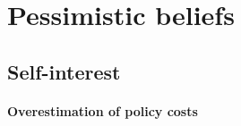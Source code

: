 \documentclass[12pt]{article} %
\begin{document}

\section{Pessimistic beliefs}\label{sec:perceptions}

\subsection{Self-interest}\label{subsec:perc_si}

\paragraph{Overestimation of policy costs}

\end{document}
